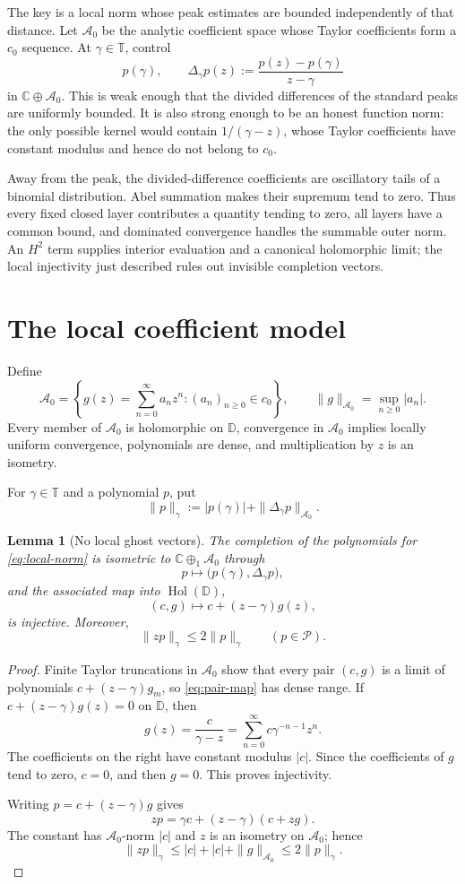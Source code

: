 \documentclass[11pt]{article}
\newtheorem{lemma}[theorem]{Lemma}
\newcommand{\D}{\mathbb D}
\newcommand{\T}{\mathbb T}
\newcommand{\C}{\mathbb C}
\newcommand{\Pcal}{\mathcal P}
\newcommand{\A}{\mathcal A_0}
\begin{document}
The key is a local norm whose peak estimates are bounded independently of
that distance.  Let $\A$ be the analytic coefficient space whose Taylor
coefficients form a $c_0$ sequence.  At $\gamma\in\T$, control
\[
 p(\gamma),\qquad
 \Delta_\gamma p(z):=\frac{p(z)-p(\gamma)}{z-\gamma}
\]
in $\C\oplus\A$.  This is weak enough that the divided differences of the
standard peaks are uniformly bounded.  It is also strong enough to be an
honest function norm: the only possible kernel would contain
$1/(\gamma-z)$, whose Taylor coefficients have constant modulus and hence
do not belong to $c_0$.

Away from the peak, the divided-difference coefficients are oscillatory
tails of a binomial distribution.  Abel summation makes their supremum tend
to zero.  Thus every fixed closed layer contributes a quantity tending to
zero, all layers have a common bound, and dominated convergence handles the
summable outer norm.  An $H^2$ term supplies interior evaluation and a
canonical holomorphic limit; the local injectivity just described rules out
invisible completion vectors.

\section{The local coefficient model}

Define
\[
 \A=\left\{g(z)=\sum_{n=0}^{\infty}a_nz^n:(a_n)_{n\ge0}\in c_0\right\},
 \qquad \|g\|_{\A}=\sup_{n\ge0}|a_n|.
 \tag{1}\label{eq:A0}
\]
Every member of $\A$ is holomorphic on $\D$, convergence in $\A$ implies
locally uniform convergence, polynomials are dense, and multiplication by
$z$ is an isometry.

For $\gamma\in\T$ and a polynomial $p$, put
\[
 \|p\|_\gamma
 :=|p(\gamma)|+\|\Delta_\gamma p\|_{\A}.
 \tag{2}\label{eq:local-norm}
\]

\begin{lemma}[No local ghost vectors]\label{lem:local}
The completion of the polynomials for \eqref{eq:local-norm} is isometric to
$\C\oplus_1\A$ through
\[
 p\longmapsto\bigl(p(\gamma),\Delta_\gamma p\bigr),
 \tag{3}\label{eq:pair-map}
\]
and the associated map into $\operatorname{Hol}(\D)$,
\[
 (c,g)\longmapsto c+(z-\gamma)g(z),
 \tag{4}\label{eq:function-map}
\]
is injective.  Moreover,
\[
 \|zp\|_\gamma\le 2\|p\|_\gamma
 \qquad(p\in\Pcal).
 \tag{5}\label{eq:shift-local}
\]
\end{lemma}

\begin{proof}
Finite Taylor truncations in $\A$ show that every pair $(c,g)$ is a limit
of polynomials $c+(z-\gamma)g_m$, so \eqref{eq:pair-map} has dense range.  If
$c+(z-\gamma)g(z)=0$ on $\D$, then
\[
 g(z)=\frac{c}{\gamma-z}
 =\sum_{n=0}^{\infty}c\gamma^{-n-1}z^n.
\]
The coefficients on the right have constant modulus $|c|$.  Since the
coefficients of $g$ tend to zero, $c=0$, and then $g=0$.  This proves
injectivity.

Writing $p=c+(z-\gamma)g$ gives
\[
 zp=\gamma c+(z-\gamma)(c+zg).
\]
The constant has $\A$-norm $|c|$ and $z$ is an isometry on $\A$; hence
\[
 \|zp\|_\gamma
 \le |c|+|c|+\|g\|_{\A}\le2\|p\|_\gamma.
\]
\end{proof}
\end{document}
